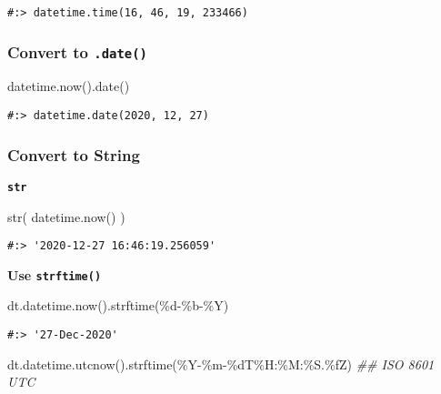 \documentclass[
]{book}
\newenvironment{Shaded}{\begin{snugshade}}{\end{snugshade}}
\newcommand{\BuiltInTok}[1]{#1}
\newcommand{\CommentTok}[1]{\textcolor[rgb]{0.37,0.37,0.37}{\textit{#1}}}
\newcommand{\NormalTok}[1]{#1}
\newcommand{\SpecialCharTok}[1]{\textcolor[rgb]{0,0,0}{#1}}
\newcommand{\StringTok}[1]{\textcolor[rgb]{0.5,0.5,0.5}{#1}}
\begin{document}
\begin{verbatim}
#:> datetime.time(16, 46, 19, 233466)
\end{verbatim}

\hypertarget{convert-to-.date}{%
\subsubsection{\texorpdfstring{Convert to \texttt{.date()}}{Convert to .date()}}\label{convert-to-.date}}

\begin{Shaded}
\begin{Highlighting}[]
\NormalTok{datetime.now().date()}
\end{Highlighting}
\end{Shaded}

\begin{verbatim}
#:> datetime.date(2020, 12, 27)
\end{verbatim}

\hypertarget{convert-to-string}{%
\subsubsection{Convert to String}\label{convert-to-string}}

\textbf{\texttt{str}}

\begin{Shaded}
\begin{Highlighting}[]
\BuiltInTok{str}\NormalTok{( datetime.now() )}
\end{Highlighting}
\end{Shaded}

\begin{verbatim}
#:> '2020-12-27 16:46:19.256059'
\end{verbatim}

\textbf{Use \texttt{strftime()}}

\begin{Shaded}
\begin{Highlighting}[]
\NormalTok{dt.datetime.now().strftime(}\StringTok{\textquotesingle{}}\SpecialCharTok{\%d}\StringTok{{-}\%b{-}\%Y\textquotesingle{}}\NormalTok{)}
\end{Highlighting}
\end{Shaded}

\begin{verbatim}
#:> '27-Dec-2020'
\end{verbatim}

\begin{Shaded}
\begin{Highlighting}[]
\NormalTok{dt.datetime.utcnow().strftime(}\StringTok{\textquotesingle{}\%Y{-}\%m{-}}\SpecialCharTok{\%d}\StringTok{T\%H:\%M:\%S.}\SpecialCharTok{\%f}\StringTok{Z\textquotesingle{}}\NormalTok{)  }\CommentTok{\#\# ISO 8601 UTC}
\end{Highlighting}
\end{Shaded}
\end{document}
